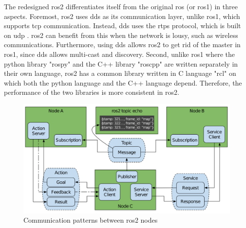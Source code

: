 The redesigned \gls{ros}2 differentiates itself from the original \gls{ros} (or \gls{ros}1) in three aspects. Foremost, \gls{ros}2 uses \gls{dds} as its communication layer, unlike \gls{ros}1, which supports \gls{tcp} communication. Instead, \gls{dds} uses the \gls{rtps} protocol, which is built on \gls{udp} \cite{OMG2021}. \gls{ros}2 can benefit from this when the network is lousy, such as wireless communications. Furthermore, using \gls{dds} allows \gls{ros}2 to get rid of the master in \gls{ros}1, since \gls{dds} allows multi-cast and discovery.  Second, unlike \gls{ros}1 where the \gls{python} library "rospy" and the C++ library "roscpp" are written separately in their own language, \gls{ros}2 has a common library written in C language "rcl" on which both the \gls{python} language and the C++ language depend. Therefore, the performance of the two libraries is more consistent in \gls{ros}2.

\begin{figure}
    \centering
    \includegraphics[width=\linewidth]{figures/background/ros2_node_interfaces.png}
    \caption[Communication patterns between \gls{ros}2 nodes]{Communication patterns between \gls{ros}2 nodes \cite{Macenski2022}}
    \label{fig:communication_patterns} 
\end{figure}

